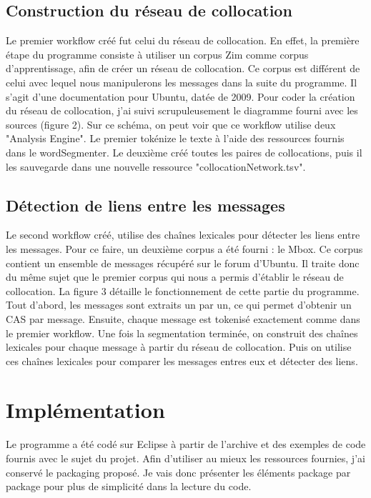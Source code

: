 \documentclass[a4paper]{article}
\begin{document}
	
	\subsection{Construction du réseau de collocation}
	
	Le premier workflow créé fut celui du réseau de collocation. En effet, la première étape du programme consiste à utiliser un corpus Zim comme corpus d'apprentissage, afin de créer un réseau de collocation. Ce corpus est différent de celui avec lequel nous manipulerons les messages dans la suite du programme. Il s'agit d'une documentation pour Ubuntu, datée de 2009. Pour coder la création du réseau de collocation, j'ai suivi scrupuleusement le diagramme fourni avec les sources (figure 2). Sur ce schéma, on peut voir que ce workflow utilise deux "Analysis Engine". Le premier tokénize le texte à l'aide des ressources fournis dans le wordSegmenter. Le deuxième créé toutes les paires de collocations, puis il les sauvegarde dans une nouvelle ressource "collocationNetwork.tsv".

	\subsection{Détection de liens entre les messages}

	Le second workflow créé, utilise des chaînes lexicales pour détecter les liens entre les messages. Pour ce faire, un deuxième corpus a été fourni : le Mbox. Ce corpus contient un ensemble de messages récupéré sur le forum d'Ubuntu. Il traite donc du même sujet que le premier corpus qui nous a permis d’établir le réseau de collocation. La figure 3 détaille le fonctionnement de cette partie du programme. Tout d'abord, les messages sont extraits un par un, ce qui permet d'obtenir un CAS par message. Ensuite, chaque message est tokenisé exactement comme dans le premier workflow. Une fois la segmentation terminée, on construit des chaînes lexicales pour chaque message à partir du réseau de collocation. Puis on utilise ces chaînes lexicales pour comparer les messages entres eux et détecter des liens.
	
	\section{Implémentation}

Le programme a été codé sur Eclipse à partir de l'archive et des exemples de code fournis avec le sujet du projet. Afin d'utiliser au mieux les ressources fournies, j'ai conservé le packaging proposé. Je vais donc présenter les éléments package par package pour plus de simplicité dans la lecture du code. 
\end{document}
